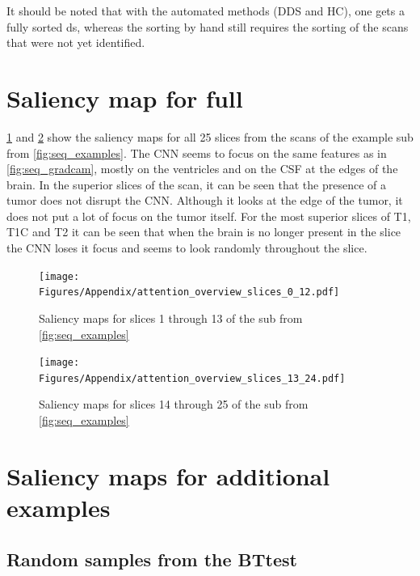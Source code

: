 \begin{subappendices}
It should be noted that with the automated methods (\gls{DDS} and \gls{HC}), one gets a fully sorted \gls{ds}, whereas the sorting by hand still requires the sorting of the \glspl{scan} that were not yet identified.

\clearpage

\section{Saliency map for full }
\label{app:saliency}

\cref{fig:saliency_lower_slices} and \cref{fig:saliency_upper_slices} show the saliency maps for all 25 \glspl{slice} from the \glspl{scan} of the example \gls{sub} from \cref{fig:seq_examples}.
The \gls{CNN} seems to focus on the same features as in \cref{fig:seq_gradcam}, mostly on the ventricles and on the \gls{CSF} at the edges of the brain.
In the superior \glspl{slice} of the \gls{scan}, it can be seen that the presence of a tumor does not disrupt the \gls{CNN}.
Although it looks at the edge of the tumor, it does not put a lot of focus on the tumor itself.
For the most superior \glspl{slice} of \gls{T1}, \gls{T1C} and \gls{T2} it can be seen that when the brain is no longer present in the \gls{slice} the \gls{CNN} loses it focus and seems to look randomly throughout the \gls{slice}.

\begin{figure}[ht]
\texttt{[image: Figures/Appendix/attention\_overview\_slices\_0\_12.pdf]}
\caption{Saliency maps for \glspl{slice} 1 through 13 of the \gls{sub} from \cref{fig:seq_examples}}
\label{fig:saliency_lower_slices}
\end{figure}

\begin{figure}[ht]
\texttt{[image: Figures/Appendix/attention\_overview\_slices\_13\_24.pdf]}
\caption{Saliency maps for \glspl{slice} 14 through 25 of the \gls{sub} from \cref{fig:seq_examples}}
\label{fig:saliency_upper_slices}
\end{figure}


\clearpage

\section{Saliency maps for additional examples}
\label{app:artifactsaliency}

\subsection{Random samples from the \gls{BTtest}}
\label{app:randomtumorsample}


\end{subappendices}
